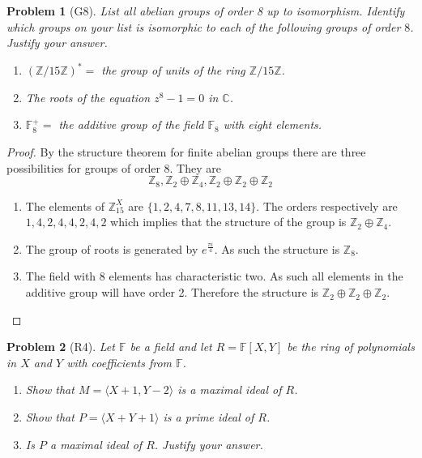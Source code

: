 \documentclass[10pt]{article}
\newcommand{\sk}{\vskip 10mm}
\newcommand{\bb}[1]{\mathbb{#1}}
\theoremstyle{plain}
\newtheorem{problem}{Problem}
\theoremstyle{remark}
\begin{document}
\sk


\begin{problem}[G8]
  List all abelian groups of order 8 up to isomorphism. Identify which groups on
  your list is isomorphic to each of the following groups of order $8$. Justify
  your answer.
  \begin{enumerate}
  \item $(\bb{Z}/15\bb{Z})^*=$ the group of units of the ring $\bb{Z}/15\bb{Z}$.
  \item The roots of the equation $z^8-1=0$ in $\bb{C}$.
  \item $\bb{F}_8^+=$ the additive group of the field $\bb{F}_8$ with
    eight elements.
  \end{enumerate}
\end{problem}

\begin{proof}
  By the structure theorem for finite abelian groups there are three
  possibilities for groups of order 8. They are
  \[ \bb{Z}_8,\bb{Z}_2\oplus\bb{Z}_4, \bb{Z}_2\oplus\bb{Z}_2\oplus\bb{Z}_2 \]

  \begin{enumerate}
  \item The elements of $\bb{Z}_{15}^X$ are $\{1,2,4,7,8,11,13,14\}$. The
    orders respectively are $1,4,2,4,4,2,4,2$ which implies that
    the structure of the group is $\bb{Z}_2\oplus\bb{Z}_4$.
  \item The group of roots is generated by $e^{\frac{\pi i}{4}}$. As such the
    structure is $\bb{Z}_8$.
  \item The field with 8 elements has characteristic two. As such
    all elements in the additive group will have order 2. Therefore
    the structure is $\bb{Z}_2\oplus\bb{Z}_2\oplus\bb{Z}_2$.
  \end{enumerate}
\end{proof}

\sk


\begin{problem}[R4]
  Let $\bb{F}$ be a field and let $R=\bb{F}[X,Y]$ be the ring of polynomials
  in $X$ and $Y$ with coefficients from $\bb{F}$.
  \begin{enumerate}
  \item Show that $M=\langle X+1,Y-2\rangle$ is a maximal ideal of $R$.
  \item Show that $P=\langle X+Y+1\rangle$ is a prime ideal of $R$.
  \item Is $P$ a maximal ideal of $R$. Justify your answer.
  \end{enumerate}
\end{problem}
\end{document}
